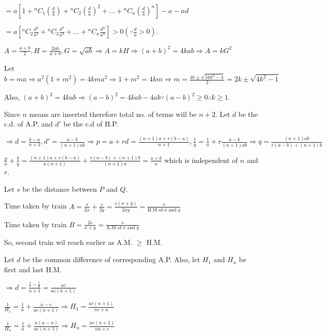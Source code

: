   $= a\left[1 + {}^nC_1\left(\frac{d}{a}\right) + {}^nC_2\left(\frac{d}{a}\right)^2 + \ldots +
  {}^nC_n\left(\frac{d}{a}\right)^n\right] - a - nd$

  $= a\left[{}^nC_2\frac{d^2}{a^2} + {}^nC_3\frac{d^3}{a^3} + \ldots + {}^nC_n\frac{d^n}{a^n}\right] > 0 \left(\because
  \frac{d}{a}> 0\right)$.
\item $A = \frac{a + b}{2}, H=\frac{2ab}{a + b}, G = \sqrt{ab}\Rightarrow A = kH\Rightarrow (a + b)^2 = 4kab \Rightarrow A = kG^2$

  Let $b = ma\Rightarrow a^2(1 + m^2) = 4kma^2 \Rightarrow 1 + m^2 = 4km \Rightarrow m = \frac{4k \pm
    \sqrt{16k^2 - 4}}{2} = 2k\pm\sqrt{4k^2 - 1}$

  Also, $(a + b)^2 = 4kab \Rightarrow (a - b)^2 = 4kab - 4ab\because (a - b)^2 \geq 0 \therefore k \geq 1$.
\item Since $n$ means are inserted therefore total no. of terms will be $n + 2.$ Let $d$ be the c.d. of A.P. and
  $d'$ be the c.d of H.P.

  $\Rightarrow d = \frac{b - a}{n + 1}, d' = \frac{a - b}{(n + 1)ab}\Rightarrow p = a + rd = \frac{(n + 1)a
  + r(b - a)}{n + 1}, \frac{1}{q} = \frac{1}{a} + r\frac{a - b}{(n + 1)ab} \Rightarrow q =
  \frac{(n + 1)ab}{r(a - b) + (n + 1)b}$

  $\frac{p}{a} + \frac{b}{q} = \frac{(n + 1)a + r(b - a)}{a(n + 1)} + \frac{r(a - b) + (n + 1)b}{(n + 1)a} = \frac{a + b}{a}$
  which is independent of $n$ and $r$.
\item Let $s$ be the distance between $P$ and $Q.$

  Time taken by train $A = \frac{s}{2x} + \frac{s}{2y} = \frac{s(x + y)}{2xy} = \frac{s}{\text{H.M of}\;x \;\text{and}\;y}$

  Time taken by train $B = \frac{2s}{x + y} = \frac{s}{\text{A.M of}\;x \;\text{and}\;y}$

  So, second train wil reach earlier as A.M. $\geq$ H.M.
\item Let $d$ be the common difference of corresponding A.P. Also, let $H_1$ and $H_n$ be first and last
  H.M.

  $\Rightarrow d = \frac{\frac{1}{c} - \frac{1}{a}}{n + 1} = \frac{ac}{ac(n + 1)}$

  $\frac{1}{H_1} = \frac{1}{a} + \frac{a - c}{ac(n + 1)} \Rightarrow H_1 = \frac{ac(n + 1)}{nc + a}$

  $\frac{1}{H_n} = \frac{1}{a} + \frac{n(a - n)}{ac(n + 1)} \Rightarrow H_n = \frac{ac(n + 1)}{na + c}$

